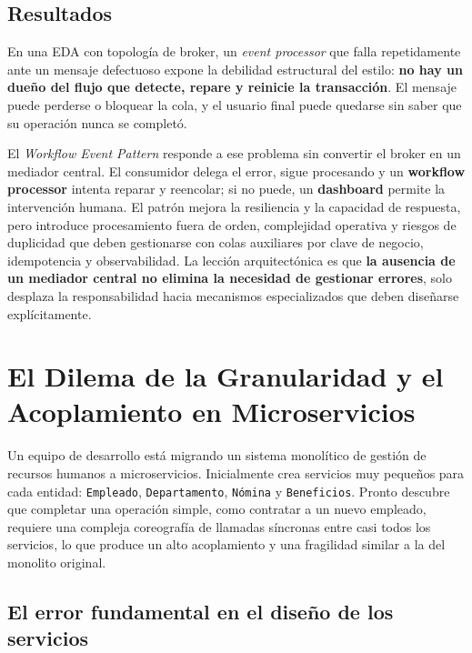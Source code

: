 \documentclass[12pt,a4paper]{article}
\begin{document}
\subsection{Resultados}

En una EDA con topología de broker, un \emph{event processor} que falla repetidamente ante un mensaje defectuoso expone la debilidad estructural del estilo: \textbf{no hay un dueño del flujo que detecte, repare y reinicie la transacción}. El mensaje puede perderse o bloquear la cola, y el usuario final puede quedarse sin saber que su operación nunca se completó.

El \emph{Workflow Event Pattern} responde a ese problema sin convertir el broker en un mediador central. El consumidor delega el error, sigue procesando y un \textbf{workflow processor} intenta reparar y reencolar; si no puede, un \textbf{dashboard} permite la intervención humana. El patrón mejora la resiliencia y la capacidad de respuesta, pero introduce procesamiento fuera de orden, complejidad operativa y riesgos de duplicidad que deben gestionarse con colas auxiliares por clave de negocio, idempotencia y observabilidad. La lección arquitectónica es que \textbf{la ausencia de un mediador central no elimina la necesidad de gestionar errores}, solo desplaza la responsabilidad hacia mecanismos especializados que deben diseñarse explícitamente.

\section{El Dilema de la Granularidad y el Acoplamiento en Microservicios}

Un equipo de desarrollo está migrando un sistema monolítico de gestión de recursos humanos a microservicios. Inicialmente crea servicios muy pequeños para cada entidad: \texttt{Empleado}, \texttt{Departamento}, \texttt{Nómina} y \texttt{Beneficios}. Pronto descubre que completar una operación simple, como contratar a un nuevo empleado, requiere una compleja coreografía de llamadas síncronas entre casi todos los servicios, lo que produce un alto acoplamiento y una fragilidad similar a la del monolito original.

\subsection{El error fundamental en el diseño de los servicios}
\end{document}
